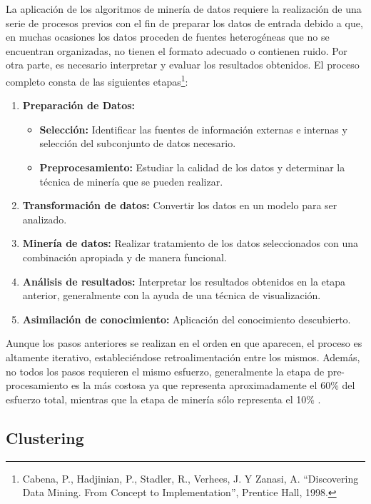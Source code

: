 \documentclass[a4paper,openright,12pt]{book}
\theoremstyle{definition}
\theoremstyle{remark}
\begin{document}
La aplicación de los algoritmos de minería de datos requiere la realización de una serie de procesos previos con el fin de  preparar los datos de entrada debido a que, en muchas ocasiones los datos proceden de fuentes heterogéneas que no se encuentran organizadas, no tienen el formato adecuado o
contienen ruido. Por otra parte, es necesario interpretar y evaluar los resultados obtenidos. El proceso completo consta de las siguientes etapas\footnote{Cabena, P., Hadjinian, P., Stadler, R., Verhees, J. Y Zanasi, A.
“Discovering Data Mining. From Concept to Implementation”, Prentice Hall, 1998.}:

\begin{enumerate}
\item \textbf{Preparación de Datos:}
	\begin{itemize}
		\item \textbf{Selección:} Identificar las fuentes de información externas e internas y selección del subconjunto de datos necesario.
        \item \textbf{Preprocesamiento:} Estudiar la calidad de los datos y determinar la técnica de minería que se pueden realizar.
\end{itemize}
\item \textbf{Transformación de datos:} Convertir los datos en un modelo para ser analizado.
\item \textbf{Minería de datos:} Realizar tratamiento de los datos seleccionados con una combinación apropiada y de manera funcional.
\item \textbf{Análisis de resultados:} Interpretar los resultados obtenidos en la etapa anterior, generalmente con la ayuda de una técnica de visualización.
\item \textbf{Asimilación de conocimiento:} Aplicación del conocimiento descubierto.
\end{enumerate}

Aunque los pasos anteriores se realizan en el orden en que aparecen, el proceso es altamente iterativo, estableciéndose retroalimentación entre los mismos. Además, no todos los pasos requieren el mismo esfuerzo, generalmente la etapa de pre-procesamiento es la más costosa ya que representa aproximadamente el 60\% del esfuerzo total, mientras que la etapa de minería sólo representa el 10\% . 

\subsection{Clustering}
\end{document}
